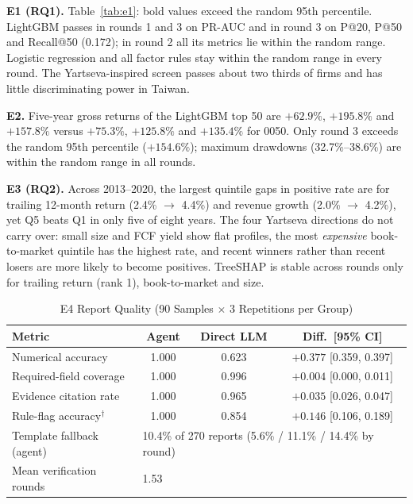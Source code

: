 \documentclass[conference]{IEEEtran}
\begin{document}
\textbf{E1 (RQ1).} Table~\ref{tab:e1}: bold values exceed the random 95th percentile. LightGBM passes in rounds 1 and 3 on PR-AUC and in round 3 on P@20, P@50 and Recall@50 (0.172); in round 2 all its metrics lie within the random range. Logistic regression and all factor rules stay within the random range in every round. The Yartseva-inspired screen passes about two thirds of firms and has little discriminating power in Taiwan.

\textbf{E2.} Five-year gross returns of the LightGBM top 50 are $+62.9\%$, $+195.8\%$ and $+157.8\%$ versus $+75.3\%$, $+125.8\%$ and $+135.4\%$ for 0050. Only round 3 exceeds the random 95th percentile ($+154.6\%$); maximum drawdowns (32.7\%--38.6\%) are within the random range in all rounds.

\textbf{E3 (RQ2).} Across 2013--2020, the largest quintile gaps in positive rate are for trailing 12-month return (2.4\% $\rightarrow$ 4.4\%) and revenue growth (2.0\% $\rightarrow$ 4.2\%), yet Q5 beats Q1 in only five of eight years. The four Yartseva directions do not carry over: small size and FCF yield show flat profiles, the most \emph{expensive} book-to-market quintile has the highest rate, and recent winners rather than recent losers are more likely to become positives. TreeSHAP is stable across rounds only for trailing return (rank 1), book-to-market and size.

\begin{table}[t]
\centering
\caption{E4 Report Quality (90 Samples $\times$ 3 Repetitions per Group)}
\label{tab:e4}
\small
\begin{tabular}{@{}lccc@{}}
\toprule
Metric & Agent & Direct LLM & Diff.\ [95\% CI] \\
\midrule
Numerical accuracy & 1.000 & 0.623 & $+0.377$ [0.359, 0.397] \\
Required-field coverage & 1.000 & 0.996 & $+0.004$ [0.000, 0.011] \\
Evidence citation rate & 1.000 & 0.965 & $+0.035$ [0.026, 0.047] \\
Rule-flag accuracy$^{\dagger}$ & 1.000 & 0.854 & $+0.146$ [0.106, 0.189] \\
\midrule
Template fallback (agent) & \multicolumn{3}{l}{10.4\% of 270 reports (5.6\% / 11.1\% / 14.4\% by round)} \\
Mean verification rounds & \multicolumn{3}{l}{1.53} \\
\bottomrule
\end{tabular}
\end{table}
\end{document}
